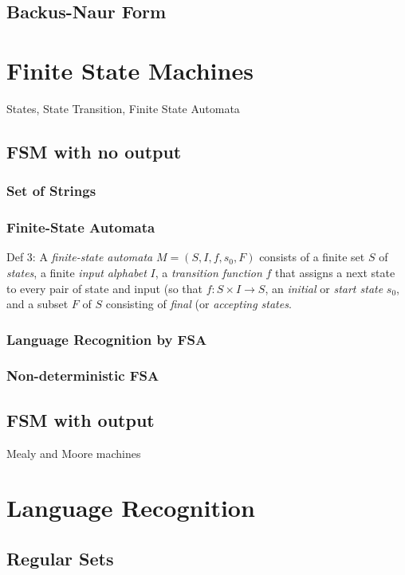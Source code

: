     \subsection {Backus-Naur Form}
    
\section {Finite State Machines}
States, State Transition, Finite State Automata
    \subsection {FSM with no output}
        \subsubsection {Set of Strings}
        \subsubsection {Finite-State Automata}
        Def 3: A \textit{finite-state automata} $M=(S,I,f,s_0,F)$ consists of a finite set $S$ of \textit{states}, a finite \textit{input alphabet} $I$, a \textit{transition function} $f$ that assigns a next state to every pair of state and input (so that $f:S \times I \rightarrow S$, an \textit{initial} or \textit{start state} $s_0$, and a subset $F$ of $S$ consisting of \textit{final} (or \textit{accepting states}.
        
        \subsubsection {Language Recognition by FSA}
        \subsubsection {Non-deterministic FSA}
        
    \subsection {FSM with output}
    Mealy and Moore machines
    
\section {Language Recognition}
    \subsection {Regular Sets}
